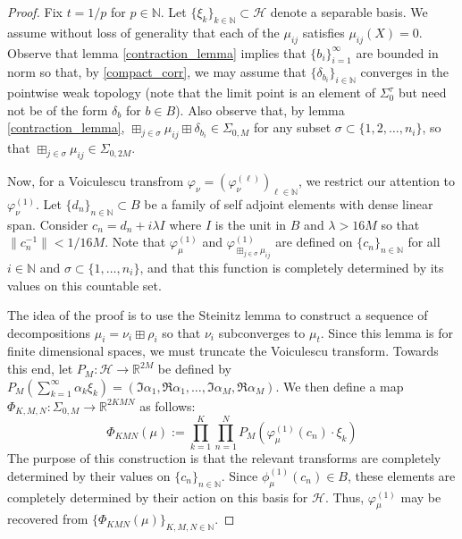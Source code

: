 \documentclass[11pt]{amsart}
\begin{document}
\begin{proof}
Fix $t = 1/p$ for $p \in \mathbb{N}$.  Let $\{\xi_{k} \}_{k\in \mathbb{N}} \subset \mathcal{H}$ denote a separable basis.  
We assume without loss of generality that each of the $\mu_{ij}$ satisfies $\mu_{ij}(X) = 0$.  Observe that lemma \ref{contraction_lemma} implies
that $\{b_{i} \}_{i=1}^{\infty}$ are bounded in norm so that, by \ref{compact_corr}, we may assume that $\{\delta_{b_{i}} \}_{i \in \mathbb{N}}$ 
converges in the pointwise weak topology (note that the limit point is an element of $\Sigma_{0}^{\tau}$ but need not be of the form $\delta_{b}$ for $b\in B$).
Also observe that, by lemma \ref{contraction_lemma}, $\boxplus_{j\in \sigma}\mu_{ij} \boxplus \delta_{b_{i}} \in \Sigma_{0,M}$ for any subset $\sigma \subset \{1,2,\ldots,n_{i} \}$, 
so that $\boxplus_{j\in \sigma} \mu_{ij} \in \Sigma_{0,2M}$.  

Now, for a Voiculescu transfrom $\varphi_{\nu} = (\varphi_{\nu}^{(\ell)})_{\ell \in \mathbb{N}}$, we restrict
our attention to $\varphi_{\nu}^{(1)}$.  Let $\{d_{n} \}_{n\in \mathbb{N}} \subset B$ be a family of self adjoint elements
with dense linear span.  Consider $c_{n}= d_{n} + i\lambda I$ where $I$ is the unit in $B$ and $\lambda > 16M$ so that $\|c_{n}^{-1} \| < 1/16M$.
Note that $\varphi^{(1)}_{\mu}$ and $\varphi^{(1)}_{\boxplus_{j\in \sigma} \mu_{ij}}$ are defined on $\{c_{n} \}_{n\in \mathbb{N}}$ for
 all $i\in \mathbb{N}$ and $\sigma \subset \{1,\ldots,n_{i} \}$, and that this function is completely determined by its values on this countable set.

The idea of the proof is to use the Steinitz lemma to construct a sequence of decompositions $\mu_{i} = \nu_{i} \boxplus \rho_{i}$ so
that $\nu_{i}$ subconverges to $\mu_{t}$.  Since this lemma is for finite dimensional spaces, we must truncate the Voiculescu transform.
Towards this end, let $P_{M}: \mathcal{H} \rightarrow \mathbb{R}^{2M}$ be defined by
$P_{M}(\sum_{k=1}^{\infty} \alpha_{k} \xi_{k}) = (\Im \alpha_{1}, \Re \alpha_{1}, \ldots , \Im \alpha_{M} , \Re \alpha_{M})$.  We then define a map
$\Phi_{K,M,N}: \Sigma_{0,M} \rightarrow \mathbb{R}^{2KMN}$ as follows:
$$\Phi_{KMN}(\mu):= \prod_{k=1}^{K} \prod_{n=1}^{N} P_{M}(\varphi^{(1)}_{\mu}(c_{n}) \cdot \xi_{k}) $$  The purpose of this construction is that the relevant
transforms are completely determined by their values on $\{ c_{n}\}_{n\in \mathbb{N}}$.  Since $\phi_{\mu}^{(1)}(c_{n}) \in B$, these elements are completely determined
by their action on this basis for $\mathcal{H}$. Thus, $\varphi_{\mu}^{(1)}$ may be recovered from $\{\Phi_{KMN}(\mu) \}_{K,M,N \in \mathbb{N}}$.




\end{proof}
\end{document}
